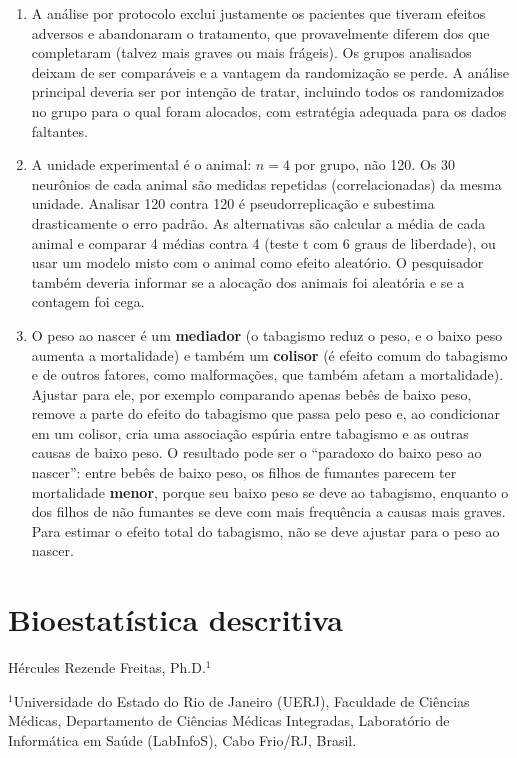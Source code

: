 \documentclass[
]{book}
\begin{document}
\begin{enumerate}
\item
  A análise por protocolo exclui justamente os pacientes que tiveram efeitos adversos e abandonaram o tratamento, que provavelmente diferem dos que completaram (talvez mais graves ou mais frágeis). Os grupos analisados deixam de ser comparáveis e a vantagem da randomização se perde. A análise principal deveria ser por intenção de tratar, incluindo todos os randomizados no grupo para o qual foram alocados, com estratégia adequada para os dados faltantes.
\item
  A unidade experimental é o animal: \(n = 4\) por grupo, não 120. Os 30 neurônios de cada animal são medidas repetidas (correlacionadas) da mesma unidade. Analisar 120 contra 120 é pseudorreplicação e subestima drasticamente o erro padrão. As alternativas são calcular a média de cada animal e comparar 4 médias contra 4 (teste t com 6 graus de liberdade), ou usar um modelo misto com o animal como efeito aleatório. O pesquisador também deveria informar se a alocação dos animais foi aleatória e se a contagem foi cega.
\item
  O peso ao nascer é um \textbf{mediador} (o tabagismo reduz o peso, e o baixo peso aumenta a mortalidade) e também um \textbf{colisor} (é efeito comum do tabagismo e de outros fatores, como malformações, que também afetam a mortalidade). Ajustar para ele, por exemplo comparando apenas bebês de baixo peso, remove a parte do efeito do tabagismo que passa pelo peso e, ao condicionar em um colisor, cria uma associação espúria entre tabagismo e as outras causas de baixo peso. O resultado pode ser o ``paradoxo do baixo peso ao nascer'': entre bebês de baixo peso, os filhos de fumantes parecem ter mortalidade \textbf{menor}, porque seu baixo peso se deve ao tabagismo, enquanto o dos filhos de não fumantes se deve com mais frequência a causas mais graves. Para estimar o efeito total do tabagismo, não se deve ajustar para o peso ao nascer.
\end{enumerate}

\chapter{Bioestatística descritiva}\label{bioestatuxedstica-descritiva}

Hércules Rezende Freitas, Ph.D.\(^1\)

\(^1\)Universidade do Estado do Rio de Janeiro (UERJ), Faculdade de Ciências Médicas, Departamento de Ciências Médicas Integradas, Laboratório de Informática em Saúde (LabInfoS), Cabo Frio/RJ, Brasil.
\end{document}
